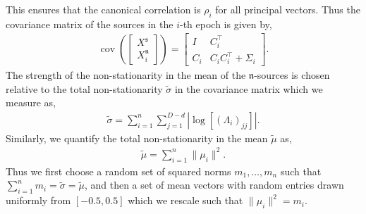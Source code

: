 \documentclass{article}
\newcommand{\1}{\ensuremath{\mathds{1}}}
\newcommand{\s}{\ensuremath{\mathfrak{s}}}
\newcommand{\n}{\ensuremath{\mathfrak{n}}}
\newcommand{\0}{\ensuremath{0}}
\DeclareMathOperator*{\cov}{cov}
\begin{document}
This ensures that the canonical correlation is $\rho_i$ for all principal vectors. 
Thus the covariance matrix of the sources in the $i$-th epoch is given by, 
\begin{align*}
	\cov \left(   
		\begin{bmatrix} X^\s \\ X^\n_i
		\end{bmatrix} 
	\right) = 
	\begin{bmatrix}
		I & C^\top_i \\
		C_i & C_i  C^\top_i + \Sigma_i 
	\end{bmatrix} .
\end{align*}
The strength of the non-stationarity in the mean of the \n-sources is chosen relative to the 
total non-stationarity $\tilde{\sigma}$ in the covariance matrix which we measure as,
\begin{align*}
	\tilde{\sigma} = \sum_{i=1}^n \sum_{j=1}^{D-d} \left|\log \left[ (\Lambda_i)_{jj} \right]\right| .
\end{align*}
Similarly, we quantify the total non-stationarity in the mean $\tilde{\mu}$ as, 
\begin{align*}
	\tilde{\mu} = \sum_{i=1}^n \| \mu_i \|^2 . 
\end{align*}
Thus we first choose a random set of squared norms $m_1, \ldots, m_n$ such that 
$\sum_{i=1}^n m_i = \tilde{\sigma} = \tilde{\mu}$, and then a set of mean vectors with random entries 
drawn uniformly from $[-0.5, 0.5]$ which we rescale such that $\| \mu_i \|^2 = m_i$. 
\end{document}
